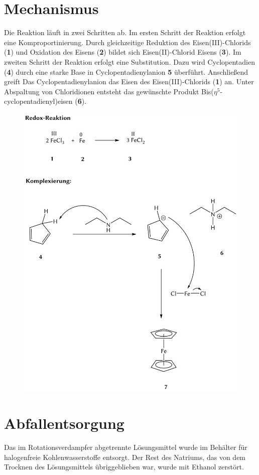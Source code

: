 \documentclass[12pt]{article}
\begin{document}
\begin{onehalfspace}
\section{Mechanismus\cite{wiberg}}
Die Reaktion läuft in zwei Schritten ab.
Im ersten Schritt der Reaktion erfolgt eine Komproportinierung. Durch gleichzeitige Reduktion des Eisen(III)-Chlorids (\textbf{1})
und Oxidation des Eisens (\textbf{2}) bildet sich Eisen(II)-Chlorid Eisens (\textbf{3}).
Im zweiten Schritt der Reaktion erfolgt eine Substitution. Dazu wird Cyclopentadien (\textbf{4}) durch eine starke Base in Cyclopentadienylanion \textbf{5} überführt. Anschließend greift Das Cyclopentadienylanion das Eisen des Eisen(III)-Chlorids (\textbf{1}) an. 
Unter Abspaltung von Chloridionen entsteht das gewünschte Produkt Bis($\eta^5$-cyclopentadienyl)eisen (\textbf{6}).
\begin{figure}[!ht]
   \centering
\includegraphics[width=\textwidth]{mechan.png}
\end{figure}
\section{Abfallentsorgung}
Das im Rotationsverdampfer abgetrennte Lösungsmittel wurde im Behälter für halogenfreie Kohlenwasserstoffe entsorgt.
Der Rest des Natriums, das von dem Trocknen des Lösungsmittels übriggeblieben war, wurde mit Ethanol zerstört. 

\end{onehalfspace}
\end{document}
